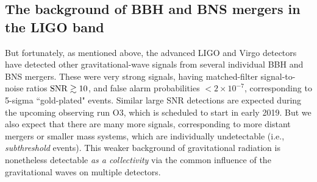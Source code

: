 \documentclass[11pt]{article}
\numberwithin{equation}{section}
\begin{document}
\subsection{The background of BBH and BNS mergers in the 
LIGO band}

But fortunately, as mentioned above, the advanced LIGO
and Virgo detectors have detected other 
gravitational-wave signals from several individual BBH 
and BNS mergers.
These were very strong signals, having 
matched-filter signal-to-noise ratios ${\rm SNR}\gtrsim 10$, 
and false alarm probabilities $<2\times 10^{-7}$,
corresponding to 5-sigma ``gold-plated" events.
Similar large SNR detections are expected during the 
upcoming observing run O3, which is scheduled to start in early 2019.
But we also expect that there are many more signals, 
corresponding to more distant mergers or smaller mass systems, 
which are 
individually undetectable (i.e., {\em subthreshold} events).
This weaker background of gravitational radiation is 
nonetheless detectable {\em as a collectivity} via the common 
influence of the gravitational waves on multiple detectors.
\end{document}
